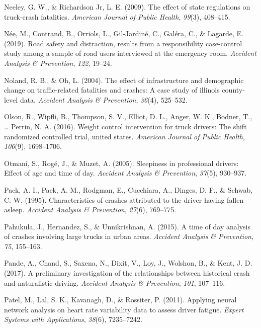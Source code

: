 \documentclass[12pt]{book}
\numberwithin{equation}{chapter}
\begin{document}
\leavevmode\hypertarget{ref-neeley2009effect}{}%
Neeley, G. W., \& Richardson Jr, L. E. (2009). The effect of state regulations on truck-crash fatalities. \emph{American Journal of Public Health}, \emph{99}(3), 408--415.

\leavevmode\hypertarget{ref-nee2019road}{}%
Née, M., Contrand, B., Orriols, L., Gil-Jardiné, C., Galéra, C., \& Lagarde, E. (2019). Road safety and distraction, results from a responsibility case-control study among a sample of road users interviewed at the emergency room. \emph{Accident Analysis \& Prevention}, \emph{122}, 19--24.

\leavevmode\hypertarget{ref-noland2004effect}{}%
Noland, R. B., \& Oh, L. (2004). The effect of infrastructure and demographic change on traffic-related fatalities and crashes: A case study of illinois county-level data. \emph{Accident Analysis \& Prevention}, \emph{36}(4), 525--532.

\leavevmode\hypertarget{ref-olson2016weight}{}%
Olson, R., Wipfli, B., Thompson, S. V., Elliot, D. L., Anger, W. K., Bodner, T., \ldots{} Perrin, N. A. (2016). Weight control intervention for truck drivers: The shift randomized controlled trial, united states. \emph{American Journal of Public Health}, \emph{106}(9), 1698--1706.

\leavevmode\hypertarget{ref-otmani2005sleepiness}{}%
Otmani, S., Rogé, J., \& Muzet, A. (2005). Sleepiness in professional drivers: Effect of age and time of day. \emph{Accident Analysis \& Prevention}, \emph{37}(5), 930--937.

\leavevmode\hypertarget{ref-pack1995characteristics}{}%
Pack, A. I., Pack, A. M., Rodgman, E., Cucchiara, A., Dinges, D. F., \& Schwab, C. W. (1995). Characteristics of crashes attributed to the driver having fallen asleep. \emph{Accident Analysis \& Prevention}, \emph{27}(6), 769--775.

\leavevmode\hypertarget{ref-pahukula2015time}{}%
Pahukula, J., Hernandez, S., \& Unnikrishnan, A. (2015). A time of day analysis of crashes involving large trucks in urban areas. \emph{Accident Analysis \& Prevention}, \emph{75}, 155--163.

\leavevmode\hypertarget{ref-pande2017preliminary}{}%
Pande, A., Chand, S., Saxena, N., Dixit, V., Loy, J., Wolshon, B., \& Kent, J. D. (2017). A preliminary investigation of the relationships between historical crash and naturalistic driving. \emph{Accident Analysis \& Prevention}, \emph{101}, 107--116.

\leavevmode\hypertarget{ref-patel2011applying}{}%
Patel, M., Lal, S. K., Kavanagh, D., \& Rossiter, P. (2011). Applying neural network analysis on heart rate variability data to assess driver fatigue. \emph{Expert Systems with Applications}, \emph{38}(6), 7235--7242.
\end{document}
